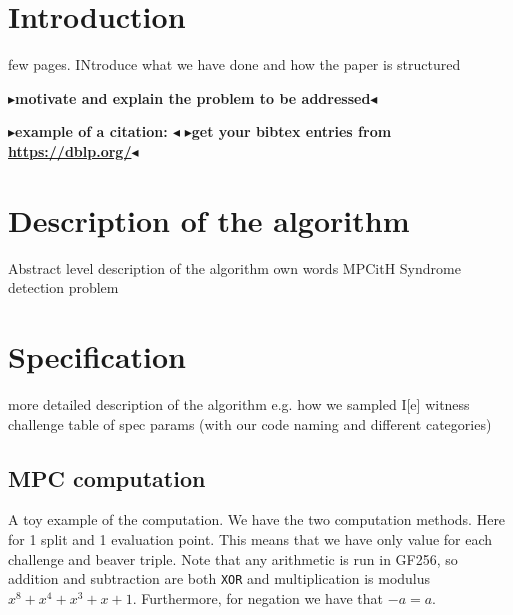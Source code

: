 \documentclass[twoside,11pt,openright]{report}
\newcommand{\todo}[1]{{\color[rgb]{.5,0,0}\textbf{$\blacktriangleright$#1$\blacktriangleleft$}}}
\begin{document}
\chapter{Introduction}
\label{ch:intro}

few pages. INtroduce what we have done and how the paper is structured

\todo{motivate and explain the problem to be addressed}

\todo{example of a citation: \cite{DBLP:conf/sas/ChristensenMS03}}
\todo{get your bibtex entries from \url{https://dblp.org/}}


\chapter{Description of the algorithm}
\label{ch:desc}

Abstract level description of the algorithm own words
MPCitH
Syndrome detection problem


\chapter{Specification}
\label{ch:spec}
more detailed description of the algorithm
e.g. how we sampled I[e] witness challenge
table of spec params (with our code naming and different categories)

\section{MPC computation}

A toy example of the computation. We have the two computation methods. Here for 1 split and 1 evaluation point. This means that we have only value for each challenge and beaver triple. Note that any arithmetic is run in GF256, so addition and subtraction are both \texttt{XOR} and multiplication is modulus $x^8 + x^4 + x^3 + x + 1$. Furthermore, for negation we have that $-a = a$. \bigskip
\end{document}
